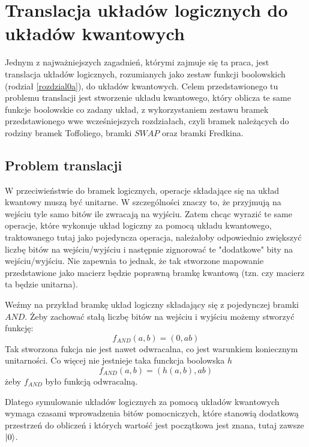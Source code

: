 \chapter{Translacja układów logicznych do układów kwantowych}
\thispagestyle{chapterBeginStyle}
\label{rozdzial2a}
Jednym z najważniejszych zagadnień, którymi zajmuje się ta praca, jest translacja układów logicznych, rozumianych jako zestaw funkcji boolowskich (rodział \ref{rozdzial0a}), do układów kwantowych. Celem przedstawionego tu problemu translacji jest stworzenie układu kwantowego, który oblicza te same funkcje boolowskie co zadany układ, z wykorzystaniem zestawu bramek przedstawionego wwe wcześniejszych rozdziałach, czyli bramek należących do rodziny bramek Toffoliego, bramki $SWAP$ oraz bramki Fredkina. 
\section{Problem translacji}
W przeciwieństwie do bramek logicznych, operacje składające się na układ kwantowy muszą być unitarne. W szczególności znaczy to, że przyjmują na wejściu tyle samo bitów ile zwracają na wyjściu. Zatem chcąc wyrazić te same operacje, które wykonuje układ logiczny za pomocą układu kwantowego, traktowanego tutaj jako pojedyncza operacja, należałoby odpowiednio zwiększyć liczbę bitów na wejściu/wyjściu i następnie zignorować te "dodatkowe" bity na wejściu/wyjściu. Nie zapewnia to jednak, że tak stworzone mapowanie przedstawione jako macierz będzie poprawną bramkę kwantową (tzn. czy macierz ta będzie unitarna).
\par Weźmy na przykład bramkę układ logiczny składający się z pojedynczej bramki $AND$. Żeby zachować stałą liczbę bitów na wejściu i wyjściu możemy stworzyć funkcję:
\[f_{AND}(a,b) = (0, ab)\]
Tak stworzona fukcja nie jest nawet odwracalna, co jest warunkiem koniecznym unitarności. Co więcej nie jestnieje taka funckcja boolowska $h$
\[f_{AND}(a,b) = (h(a,b), ab)\]
żeby $f_{AND}$ było funkcją odwracalną.
\par Dlatego symulowanie układów logicznych za pomocą układów kwantowych wymaga czasami wprowadzenia bitów pomocniczych, które stanowią dodatkową przestrzeń do obliczeń i których wartość jest początkowa jest znana, tutaj zawsze $\ket{0}$.
